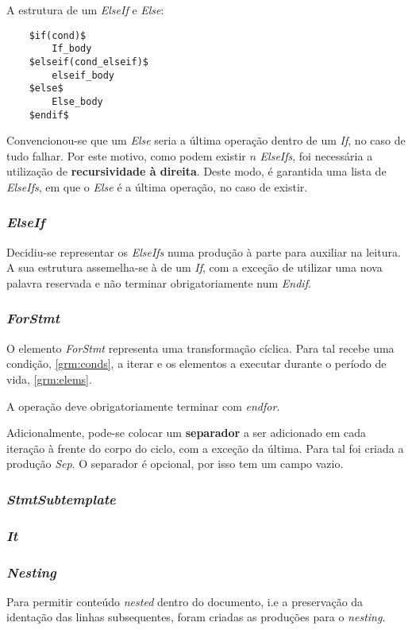 \documentclass[../relatorio.tex]{subfiles}
\begin{document}
A estrutura de um \textit{ElseIf} e \textit{Else}:
\begin{verbatim}    
    $if(cond)$
        If_body
    $elseif(cond_elseif)$
        elseif_body
    $else$
        Else_body
    $endif$
\end{verbatim}

Convencionou-se que um \textit{Else} seria a última operação dentro de um \textit{If}, no 
caso de tudo falhar. 
Por este motivo, como podem existir $n$ \textit{ElseIfs}, foi necessária a utilização 
de \textbf{recursividade à direita}. 
Deste modo, é garantida uma lista de \textit{ElseIfs}, em que o \textit{Else}
é a última operação, no caso de existir.

\subsubsection{\textit{ElseIf}} \label{grm:elseif}
Decidiu-se representar os \textit{ElseIfs} numa produção 
à parte para auxiliar na leitura.
A sua estrutura assemelha-se à de um \textit{If}, com 
a exceção de utilizar uma nova palavra reservada e não 
terminar obrigatoriamente num \textit{Endif}.

\subsubsection{\textit{ForStmt}} \label{grm:forstmt}
O elemento \textit{ForStmt} representa uma transformação cíclica.
Para tal recebe uma condição, \ref{grm:conds}, a iterar 
e os elementos a executar durante o período de vida, \ref{grm:elems}.

A operação deve obrigatoriamente terminar com \textit{endfor}.

Adicionalmente, pode-se colocar um \textbf{separador} a ser adicionado
em cada iteração à frente do corpo do ciclo, com a exceção da última.
Para tal foi criada a produção \textit{Sep}.
O separador é opcional, por isso tem um campo vazio.

\subsubsection{\textit{StmtSubtemplate}} \label{grm:sub}

\subsubsection{\textit{It}} \label{grm:it}

\subsubsection{\textit{Nesting}} \label{grm:nest}
Para permitir conteúdo \textit{nested} dentro do documento, i.e
a preservação da identação das linhas subsequentes, 
foram criadas as produções para o \textit{nesting}.
\end{document}
